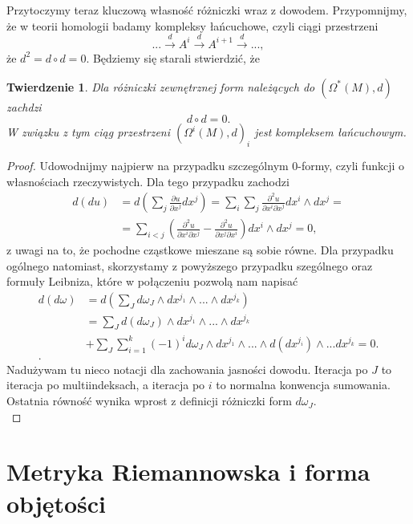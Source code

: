 \documentclass[licencjacka]{pracamgr}
\theoremstyle{definition}
\theoremstyle{definition}
\theoremstyle{plain}
\theoremstyle{plain}
\theoremstyle{plain}
\newtheorem{theorem}{Twierdzenie}[section]
\theoremstyle{plain}
\begin{document}
Przytoczymy teraz kluczową własność różniczki wraz z dowodem.
Przypomnijmy, że w teorii homologii badamy kompleksy łańcuchowe, czyli
ciągi przestrzeni
\[
   ... \xrightarrow{d} 
A^i 
   \xrightarrow{d} 
A^{i+1}
   \xrightarrow{d} 
...,
\]
że $d^2 = d \circ d = 0$. Będziemy się starali stwierdzić, że 
\begin{theorem}
Dla różniczki zewnętrznej form należących do $\left(\Omega^\ast (M), d \right)$
zachdzi
\[
d \circ d = 0.
\]
W związku z tym ciąg przestrzeni  $\left(\Omega^i (M), d \right)_i$ jest
kompleksem łańcuchowym.
\end{theorem}

\begin{proof}
Udowodnijmy najpierw na przypadku szczególnym 0-formy, czyli funkcji o
własnościach rzeczywistych. Dla tego przypadku zachodzi
\begin{align*}
d(du) & = d \left( \sum_j \frac{\partial u} {\partial x^j} dx^j \right) =
\sum_i \sum_j \frac{\partial^2 u}{\partial x^i \partial x^j } dx^i \wedge dx^j =  \\
& = \sum_{i < j} \left(
\frac{\partial^2 u}{\partial x^i \partial x^j}  -
\frac{\partial^2 u}{\partial x^j \partial x^i} 
 \right) dx^i \wedge dx^j = 0,
\end{align*}
z uwagi na to, że pochodne cząstkowe mieszane są sobie równe. 
Dla przypadku ogólnego natomiast, skorzystamy z powyższego przypadku szególnego
oraz formuły Leibniza, które w połączeniu pozwolą nam napisać
\begin{align*}
d(d \omega) & = d \left( \sum_J d \omega_J \wedge dx^{j_1} \wedge ... \wedge dx^{j_k} \right) \\
             & = \sum_J d( d\omega_J) \wedge dx^{j_1} \wedge ... \wedge dx^{j_k}  \\
& + \sum_J \sum_{i=1}^k (-1)^i d \omega_J \wedge dx^{j_1} \wedge ... \wedge d(dx^{j_i}) \wedge ... dx^{j_k} = 0.  \\.
\end{align*}
Nadużywam tu nieco notacji dla zachowania jasności dowodu. Iteracja po $J$ to iteracja
po multiindeksach, a iteracja po $i$ to normalna konwencja sumowania. Ostatnia
równość wynika wprost z definicji różniczki form $d \omega_J$. \\

\end{proof}




\section{Metryka Riemannowska i forma objętości}
\end{document}
